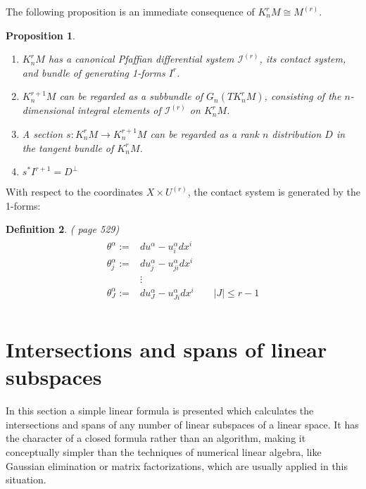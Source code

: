 \documentclass[12pt]{article}
\numberwithin{equation}{section}
\theoremstyle{plain}
\newtheorem{definition}{Definition}[section]
\newtheorem{proposition}[definition]{Proposition}
\theoremstyle{definition}
\newcommand{\ra}{\rightarrow}
\begin{document}
The following proposition is an immediate consequence of $K^{r}_{n}M\cong M^{(r)}$.
\begin{proposition}\label{idKprolong}\
\begin{enumerate}
\itemsep0em
\item{$K^{r}_{n}M$ has a canonical Pfaffian differential system $\mathcal{I}^{(r)}$, its contact system, and bundle of generating 1-forms $I^{r}$.}
\item{$K^{r+1}_{n}M$ can be regarded as a subbundle of $G_{n}(TK^{r}_{n}M)$, consisting of the $n$-dimensional integral elements of $\mathcal{I}^{(r)}$ on $K^{r}_{n}M$.}
\item{A section $s:K^{r}_{n}M\ra K^{r+1}_{n}M$ can be regarded as a rank $n$ distribution $D$ in the tangent bundle of $K^{r}_{n}M$.}
\item{\label{pbcontact}$s^{*}I^{r+1}=D^{\perp}$}
\end{enumerate}
\end{proposition}

With respect to the coordinates $X\times U^{(r)}$, the contact system is generated by the 1-forms:
\begin{definition}\label{contactstructure} \emph{(\cite{bg} page 529)}
\begin{align*}
\begin{split}
\theta^{\alpha}:=&du^{\alpha}-u^{\alpha}_{i}dx^{i}\\
\theta_{j}^{\alpha}:=&du_{j}^{\alpha}-u^{\alpha}_{ji}dx^{i}\\
 &\vdots \\
\theta_{J}^{\alpha}:=&du_{J}^{\alpha}-u^{\alpha}_{Ji}dx^{i}\qquad |J|\leq r-1\\
\end{split}
\end{align*}
\end{definition}

\section{Intersections and spans of linear subspaces}\label{meetsandspans}

In this section a simple linear formula is presented which calculates the intersections and spans of any number of linear subspaces of a linear space. It has the character of a closed formula rather than an algorithm, making it conceptually simpler than the techniques of numerical linear algebra, like Gaussian elimination or matrix factorizations, which are usually applied in this situation.
\end{document}
